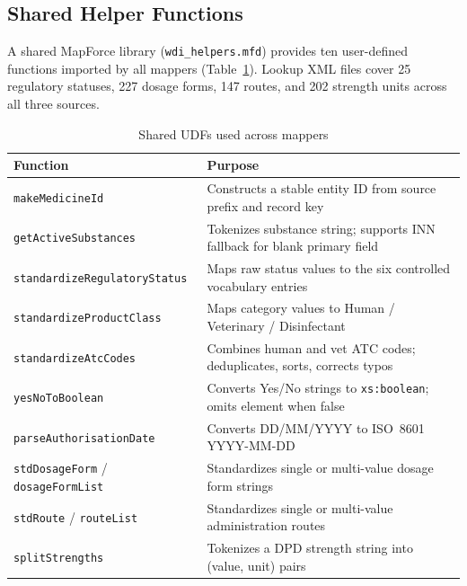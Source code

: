 \documentclass[a4paper,oneside,bibliography=totoc]{scrbook}
\begin{document}
\subsection{Shared Helper Functions}

A shared MapForce library (\texttt{wdi\_helpers.mfd}) provides ten
user-defined functions imported by all mappers
(Table~\ref{tab:udfs}). Lookup XML files cover 25 regulatory statuses,
227 dosage forms, 147 routes, and 202 strength units across all three
sources.

\begin{table}[htbp]
\centering
\caption{Shared UDFs used across mappers}
\label{tab:udfs}
\scriptsize
\begin{tabular}{|l|>{\raggedright\arraybackslash}p{7.5cm}|}
\hline
\textbf{Function} & \textbf{Purpose} \\
\hline
\texttt{makeMedicineId} & Constructs a stable entity ID from source prefix and record key \\
\texttt{getActiveSubstances} & Tokenizes substance string; supports INN fallback for blank primary field \\
\texttt{standardizeRegulatoryStatus} & Maps raw status values to the six controlled vocabulary entries \\
\texttt{standardizeProductClass} & Maps category values to Human / Veterinary / Disinfectant \\
\texttt{standardizeAtcCodes} & Combines human and vet ATC codes; deduplicates, sorts, corrects typos \\
\texttt{yesNoToBoolean} & Converts Yes/No strings to \texttt{xs:boolean}; omits element when false \\
\texttt{parseAuthorisationDate} & Converts DD/MM/YYYY to ISO~8601 YYYY-MM-DD \\
\texttt{stdDosageForm} / \texttt{dosageFormList} & Standardizes single or multi-value dosage form strings \\
\texttt{stdRoute} / \texttt{routeList} & Standardizes single or multi-value administration routes \\
\texttt{splitStrengths} & Tokenizes a DPD strength string into (value, unit) pairs \\
\hline
\end{tabular}
\end{table}

\end{document}
